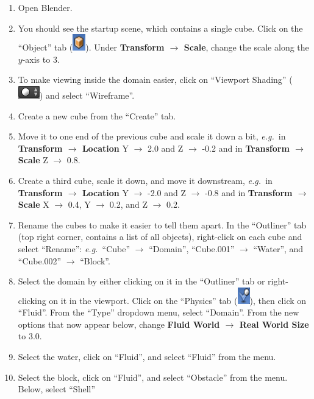 \documentclass[12pt]{article}
\newcommand{\eg}{\emph{e.g.\ }}
\begin{document}
\begin{enumerate}
\item Open Blender.
\item You should see the startup scene, which contains a single cube. Click on the ``Object'' tab 
(\includegraphics[height=\baselineskip,trim=0 4 0 -6]{object_icon.png}). Under {\bf Transform $\to$ Scale}, 
change the scale along the $y$-axis to 3.
\item To make viewing inside the domain easier, click on ``Viewport Shading'' 
(\includegraphics[height=\baselineskip,trim=0 4 0 -6]{shading_icon.png}) and select ``Wireframe''.
\item Create a new cube from the ``Create'' tab.
\item Move it to one end of the previous cube and scale it down a bit, \eg in {\bf Transform $\to$ Location} 
Y $\to$ 2.0 and Z $\to$ -0.2 and in {\bf Transform $\to$ Scale} Z $\to$ 0.8.
\item Create a third cube, scale it down, and move it downstream, \eg in {\bf Transform $\to$ Location} Y 
$\to$ -2.0 and Z $\to$ -0.8 and in {\bf Transform $\to$ Scale} X $\to$ 0.4, Y $\to$ 0.2, and Z $\to$ 0.2.
\item Rename the cubes to make it easier to tell them apart. In the ``Outliner'' tab (top right corner, 
contains a list of all objects), right-click on each cube and select ``Rename'': \eg ``Cube'' $\to$ 
``Domain'', ``Cube.001'' $\to$ ``Water'', and ``Cube.002'' $\to$ ``Block''.
\item Select the domain by either clicking on it in the ``Outliner'' tab or right-clicking on it in the 
viewport. Click on the ``Physics'' tab (\includegraphics[height=\baselineskip,trim=0 4 0 
-6]{physics_icon.png}), then click on ``Fluid''. From the ``Type'' dropdown menu, select ``Domain''. From the 
new options that now appear below, change {\bf Fluid World $\to$ Real World Size} to 3.0.
\item Select the water, click on ``Fluid'', and select ``Fluid'' from the menu.
\item Select the block, click on ``Fluid'', and select ``Obstacle'' from the menu. Below, select ``Shell'' 

\end{enumerate}
\end{document}
